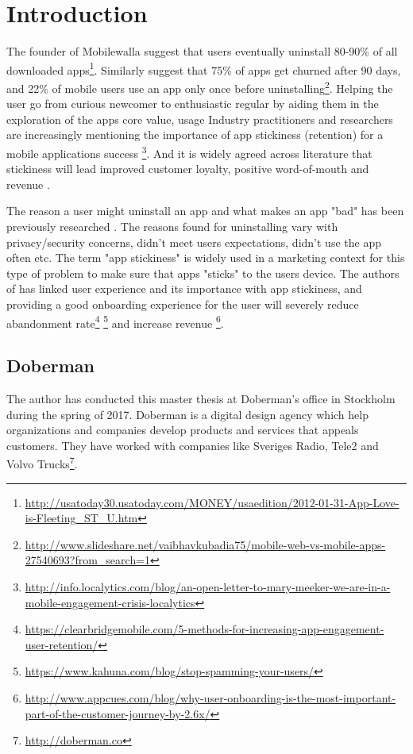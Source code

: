 \chapter{Introduction}
\label{chap:introduction}
The founder of Mobilewalla suggest that users eventually uninstall 80-90\% of all downloaded apps\footnote{\url{http://usatoday30.usatoday.com/MONEY/usaedition/2012-01-31-App-Love-is-Fleeting\_ST\_U.htm}}. Similarly \cite{Perro2016} suggest that 75\% of apps get churned after 90 days, and 22\% of mobile users use an app only once before uninstalling\footnote{\url{http://www.slideshare.net/vaibhavkubadia75/mobile-web-vs-mobile-apps-27540693?from_search=1}}. Helping the user go from curious newcomer to enthusiastic regular by aiding them in the exploration of the apps core value, usage Industry practitioners and researchers are increasingly mentioning the importance of app stickiness (retention) for a mobile applications success \cite{Perro2016} \cite{IGIGlobal2016} \cite{Kim2016}\footnote{\url{http://info.localytics.com/blog/an-open-letter-to-mary-meeker-we-are-in-a-mobile-engagement-crisis-localytics}}. And it is widely agreed across literature that stickiness will lead improved customer loyalty, positive word-of-mouth and revenue \cite{Reichheld2000} \cite{Srinivasan2002} \cite{Hsu2016a}.

The reason a user might uninstall an app and what makes an app "bad" has been previously researched \cite{Lin2012} \cite{Shklovski} \cite{Song2014}. The reasons found for uninstalling vary with privacy/security concerns, didn't meet users expectations, didn't use the app often etc. The term "app stickiness" is widely used in a marketing context for this type of problem to make sure that apps "sticks" to the users device. The authors of \cite{IGIGlobal2016} has linked user experience and its importance with app stickiness, and providing a good onboarding experience for the user will severely reduce abandonment rate\footnote{\url{https://clearbridgemobile.com/5-methods-for-increasing-app-engagement-user-retention/}} \footnote{\url{https://www.kahuna.com/blog/stop-spamming-your-users/}} and increase revenue \footnote{\url{http://www.appcues.com/blog/why-user-onboarding-is-the-most-important-part-of-the-customer-journey-by-2.6x/}}.

\section{Doberman}
The author has conducted this master thesis at Doberman's office in Stockholm during the spring of 2017. Doberman is a digital design agency which help organizations and companies develop products and services that appeals customers. They have worked with companies like Sveriges Radio, Tele2 and Volvo Trucks\footnote{\url{http://doberman.co}}.

